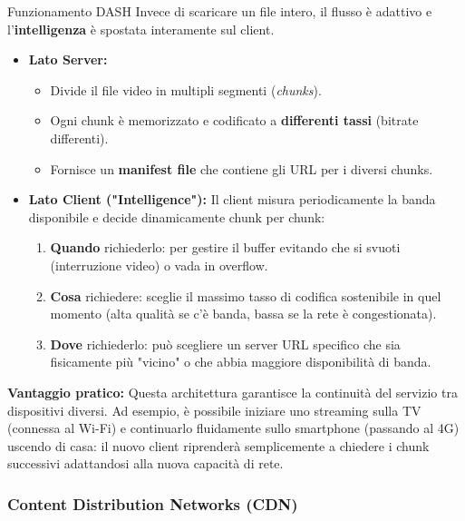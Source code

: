 \documentclass[a4paper,12pt]{report}
\begin{document}
\begin{defbox}{Funzionamento DASH}
Invece di scaricare un file intero, il flusso è adattivo e l'\textbf{intelligenza} è spostata interamente sul client.

\begin{itemize}
    \item \textbf{Lato Server:}
    \begin{itemize}
        \item Divide il file video in multipli segmenti (\textit{chunks}).
        \item Ogni chunk è memorizzato e codificato a \textbf{differenti tassi} (bitrate differenti).
        \item Fornisce un \textbf{manifest file} che contiene gli URL per i diversi chunks.
    \end{itemize}

    \item \textbf{Lato Client ("Intelligence"):}
    Il client misura periodicamente la banda disponibile e decide dinamicamente chunk per chunk:
    \begin{enumerate}
        \item \textbf{Quando} richiederlo: per gestire il buffer evitando che si svuoti (interruzione video) o vada in overflow.
        \item \textbf{Cosa} richiedere: sceglie il massimo tasso di codifica sostenibile in quel momento (alta qualità se c'è banda, bassa se la rete è congestionata).
        \item \textbf{Dove} richiederlo: può scegliere un server URL specifico che sia fisicamente più "vicino" o che abbia maggiore disponibilità di banda.
    \end{enumerate}
\end{itemize}

\textbf{Vantaggio pratico:} Questa architettura garantisce la continuità del servizio tra dispositivi diversi. Ad esempio, è possibile iniziare uno streaming sulla TV (connessa al Wi-Fi) e continuarlo fluidamente sullo smartphone (passando al 4G) uscendo di casa: il nuovo client riprenderà semplicemente a chiedere i chunk successivi adattandosi alla nuova capacità di rete.
\end{defbox}

\vspace{1cm}
\subsubsection{Content Distribution Networks (CDN)}
\end{document}
